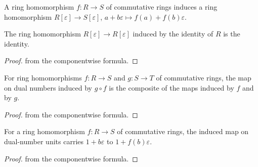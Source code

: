 \begin{definition}\label{mk-def:dual_number_map}
  \leanok

  A ring homomorphism \(f : R \to S\) of commutative rings induces a
  ring homomorphism
  \(R[\varepsilon] \to S[\varepsilon]\),
  \(a + b\varepsilon \mapsto f(a) + f(b)\varepsilon\).
\end{definition}

\begin{lemma}\label{mk-lem:dual_number_map_id}
  \leanok

  The ring homomorphism \(R[\varepsilon] \to R[\varepsilon]\) induced
  by the identity of \(R\) is the identity.
\end{lemma}

\begin{proof}
  \leanokImmediate from the componentwise formula.
\end{proof}

\begin{lemma}\label{mk-lem:dual_number_map_comp}
  \leanok

  For ring homomorphisms \(f : R \to S\) and \(g : S \to T\) of
  commutative rings, the map on dual numbers induced by
  \(g \circ f\) is the composite of the maps induced by \(f\) and by
  \(g\).
\end{lemma}

\begin{proof}
  \leanokImmediate from the componentwise formula.
\end{proof}

\begin{lemma}\label{mk-lem:dual_number_map_trunc_exp}
  \leanok

  For a ring homomorphism \(f : R \to S\) of commutative rings, the
  induced map on dual-number units carries \(1 + b\varepsilon\) to
  \(1 + f(b)\varepsilon\).
\end{lemma}

\begin{proof}
  \leanokImmediate from the componentwise formula.
\end{proof}

